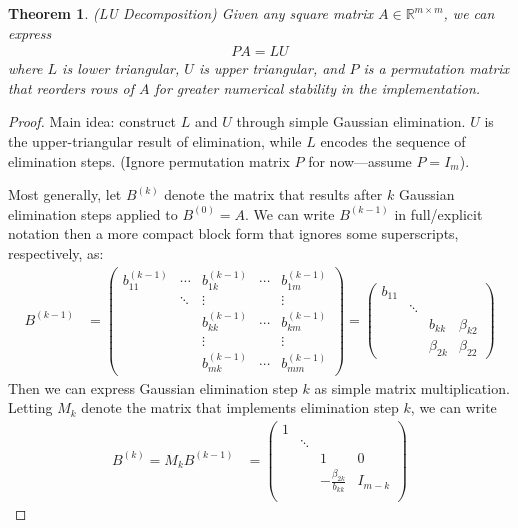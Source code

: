 \documentclass[12pt]{article}
\numberwithin{equation}{section} %
\theoremstyle{plain}
\newtheorem{thm}{Theorem}[section]
\theoremstyle{definition}
\theoremstyle{remark}
\newcommand{\Rmm}{\mathbb{R}^{m\times m}}
\begin{document}
\begin{thm}\emph{(LU Decomposition)}
Given any square matrix $A\in\Rmm$, we can express
\begin{align}
  PA = LU
  \label{ludecomp}
\end{align}
where $L$ is lower triangular, $U$ is upper triangular, and $P$ is a
permutation matrix that reorders rows of $A$ for greater numerical
stability in the implementation.
\end{thm}
\begin{proof}%
Main idea:
construct $L$ and $U$ through simple Gaussian elimination.
$U$ is the upper-triangular result of elimination, while
$L$ encodes the sequence of elimination steps.
(Ignore permutation matrix $P$ for now---assume $P=I_m$).

Most generally, let $B^{(k)}$ denote the matrix that results after $k$
Gaussian elimination steps applied to $B^{(0)}=A$. We can write
$B^{(k-1)}$ in full/explicit notation then a more compact block form
that ignores some superscripts, respectively, as:
\begin{align*}
  B^{(k-1)}
  &=
  \begin{pmatrix}
    b_{11}^{(k-1)} & \cdots & b_{1k}^{(k-1)} & \cdots & b_{1m}^{(k-1)}\\
    & \ddots & \vdots  & & \vdots\\
    & & b_{kk}^{(k-1)} & \cdots & b_{km}^{(k-1)} \\
    & & \vdots & & \vdots \\
    & & b_{mk}^{(k-1)} & \cdots & b_{mm}^{(k-1)}
  \end{pmatrix}
  =
  \begin{pmatrix}
    b_{11} & \\
    & \ddots &  & \\
    & & b_{kk} & \beta_{k2} \\
    & & \beta_{2k} & \beta_{22}
  \end{pmatrix}
\end{align*}
Then we can express Gaussian elimination step $k$ as simple matrix
multiplication. Letting $M_k$ denote the matrix that implements
elimination step $k$, we can write
\begin{align*}
  B^{(k)} = M_k B^{(k-1)}
  &=
  \begin{pmatrix}
    1 & \\
      & \ddots & & \\
      &  & 1 & 0 \\
      &  & -\frac{\beta_{2k}}{b_{kk}} & I_{m-k}\\

\end{pmatrix}
\end{align*}
\end{proof}
\end{document}
